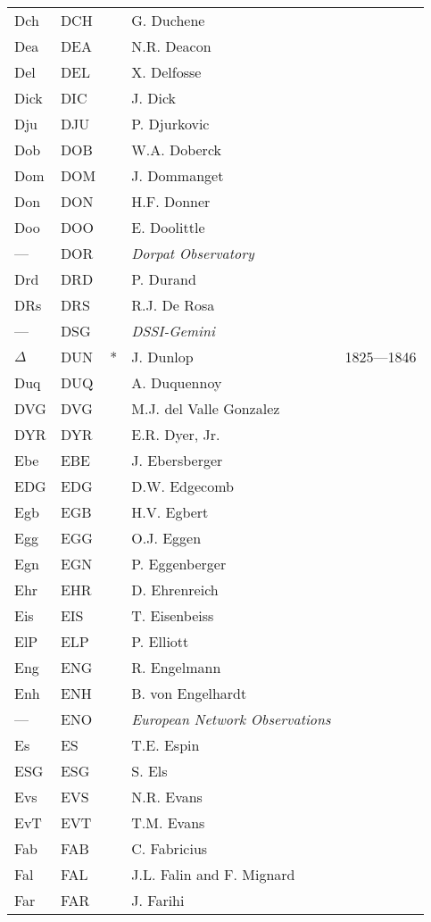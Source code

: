 \begin{longtable}{l|l|c|p{59mm}|l}
Dch & DCH &   & G. Duchene & \\
Dea & DEA &   & N.R. Deacon & \\
Del & DEL &   & X. Delfosse & \\
Dick & DIC &   & J. Dick & \\
Dju & DJU &   & P. Djurkovic & \\
Dob & DOB &   & W.A. Doberck & \\
Dom & DOM &   & J. Dommanget & \\
Don & DON &   & H.F. Donner & \\
Doo & DOO &   & E. Doolittle & \\
--- & DOR &   & \emph{Dorpat Observatory} & \\
Drd & DRD &   & P. Durand & \\
DRs & DRS &   & R.J. De Rosa & \\
--- & DSG &   & \emph{DSSI-Gemini} & \\
$\Delta$ & DUN & * & J. Dunlop & 1825---1846 \\
Duq & DUQ &   & A. Duquennoy & \\
DVG & DVG &   & M.J. del Valle Gonzalez & \\
DYR & DYR &   & E.R. Dyer, Jr. & \\\midrule
Ebe & EBE &   & J. Ebersberger & \\
EDG & EDG &   & D.W. Edgecomb & \\
Egb & EGB &   & H.V. Egbert & \\
Egg & EGG &   & O.J. Eggen & \\
Egn & EGN &   & P. Eggenberger & \\
Ehr & EHR &   & D. Ehrenreich & \\
Eis & EIS &   & T. Eisenbeiss & \\
ElP & ELP &   & P. Elliott & \\
Eng & ENG &   & R. Engelmann & \\
Enh & ENH &   & B. von Engelhardt & \\
--- & ENO &   & \emph{European Network Observations} & \\
Es  & ES  &   & T.E. Espin \\
ESG & ESG &   & S. Els & \\
Evs & EVS &   & N.R. Evans & \\
EvT & EVT &   & T.M. Evans & \\\midrule
Fab & FAB &   & C. Fabricius & \\
Fal & FAL &   & J.L. Falin and F. Mignard & \\
Far & FAR &   & J. Farihi & \\

\end{longtable}
